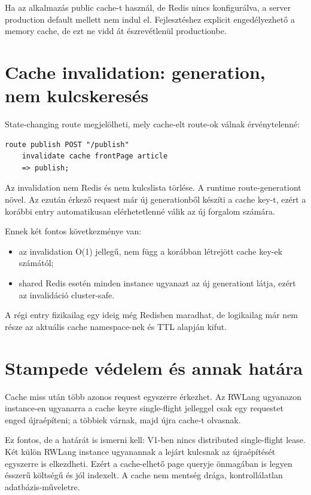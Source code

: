 Ha az alkalmazás public cache-t használ, de Redis nincs konfigurálva, a server production default mellett nem indul el. Fejlesztéshez explicit engedélyezhető a memory cache, de ezt ne vidd át észrevétlenül productionbe.

\section{Cache invalidation: generation, nem kulcskeresés}

State-changing route megjelölheti, mely cache-elt route-ok válnak érvénytelenné:

\begin{lstlisting}[language=RWLang]
route publish POST "/publish"
    invalidate cache frontPage article
    => publish;
\end{lstlisting}

Az invalidation nem Redis  és nem kulcslista törlése. A runtime route-generationt növel. Az ezután érkező request már új generationből készíti a cache key-t, ezért a korábbi entry automatikusan elérhetetlenné válik az új forgalom számára.

Ennek két fontos következménye van:

\begin{itemize}
  \item az invalidation O(1) jellegű, nem függ a korábban létrejött cache key-ek számától;
  \item shared Redis esetén minden instance ugyanazt az új generationt látja, ezért az invalidáció cluster-safe.
\end{itemize}

A régi entry fizikailag egy ideig még Redisben maradhat, de logikailag már nem része az aktuális cache namespace-nek és TTL alapján kifut.

\section{Stampede védelem és annak határa}

Cache miss után több azonos request egyszerre érkezhet. Az RWLang ugyanazon instance-en ugyanarra a cache keyre single-flight jelleggel csak egy requestet enged újraépíteni; a többiek várnak, majd újra cache-t olvasnak.

Ez fontos, de a határát is ismerni kell: V1-ben nincs distributed single-flight lease. Két külön RWLang instance ugyanannak a lejárt kulcsnak az újraépítését egyszerre is elkezdheti. Ezért a cache-elhető page queryje önmagában is legyen ésszerű költségű és jól indexelt. A cache nem mentség drága, kontrollálatlan adatbázis-műveletre.


